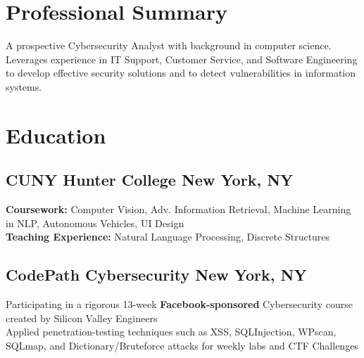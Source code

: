 \documentclass[a4paper]{Resume}
\begin{document}

\descript{}

\section{Professional Summary}
\hrulefill

\pt  A prospective Cybersecurity Analyst with background in computer science.  Leverages experience in IT Support, Customer Service, and Software Engineering to develop effective security solutions and to detect vulnerabilities in information systems.   
\sectionsep

\section{Education}
\hrulefill

\subsection{CUNY Hunter College \hfill \normalfont New York, NY}



\pt \textbf{Coursework:} Computer Vision, Adv. Information Retrieval, Machine Learning in NLP, Autonomous Vehicles, UI Design \\
\pt \textbf{Teaching Experience:} Natural Language Processing, Discrete Structures
\sectionsep

\subsection{CodePath Cybersecurity \hfill \normalfont New York, NY}

\pt Participating in a rigorous 13-week \textbf{Facebook-sponsored} Cybersecurity course created by Silicon Valley Engineers  \\
\pt Applied penetration-testing techniques such as XSS, SQLInjection, WPscan, SQLmap, and Dictionary/Bruteforce attacks for weekly labs and CTF Challenges
\sectionsep
\end{document}
